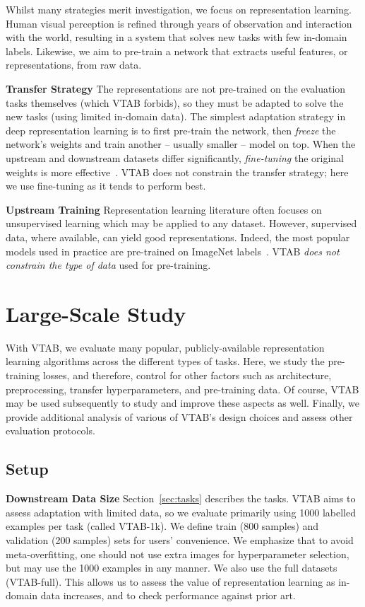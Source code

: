 Whilst many strategies merit investigation, we focus on representation learning. Human visual perception is refined through years of observation and interaction with the world, resulting in a system that solves new tasks with few in-domain labels. Likewise, we aim to pre-train a network that extracts useful features, or representations, from raw data.

\textbf{Transfer Strategy}\quad
The representations are not pre-trained on the evaluation tasks themselves (which VTAB forbids), so they must be adapted to solve the new tasks (using limited in-domain data). The simplest adaptation strategy in deep representation learning is to first pre-train the network, then \emph{freeze} the network's weights and train another -- usually smaller -- model on top. When the upstream and downstream datasets differ significantly,
\emph{fine-tuning} the original weights is more effective~\citep{yosinski2014,kornblith2018better}. VTAB does not constrain the transfer strategy; here we use fine-tuning as it tends to perform best.

\textbf{Upstream Training}\quad
Representation learning literature often focuses on unsupervised learning which may be applied to any dataset. However, supervised data, where available, can yield good representations. Indeed, the most popular models used in practice are pre-trained on ImageNet labels~\citep[and refs therein]{huh2016makes}. VTAB \emph{does not constrain the type of data} used for pre-training.

\section{Large-Scale Study\label{sec:experiments}}

With VTAB, we evaluate many popular, publicly-available representation learning algorithms across the different types of tasks. Here, we study the pre-training losses, and therefore, control for other factors such as architecture, preprocessing, transfer hyperparameters, and pre-training data. Of course, VTAB may be used subsequently to study and improve these aspects as well. Finally, we provide additional analysis of various of VTAB's design choices and assess other evaluation protocols.

\subsection{Setup\label{sec:setup}}

\textbf{Downstream Data Size}\quad
Section~\ref{sec:tasks} describes the tasks. VTAB aims to assess adaptation with limited data, so we evaluate primarily using \num{1000} labelled examples per task (called VTAB-1k). We define train (\num{800} samples) and validation (\num{200} samples) sets for users' convenience. We emphasize that to avoid meta-overfitting, one should not use extra images for hyperparameter selection, but may use the \num{1000} examples in any manner. We also use the full datasets (VTAB-full). This allows us to assess the value of representation learning as in-domain data increases, and to check performance against prior art.

